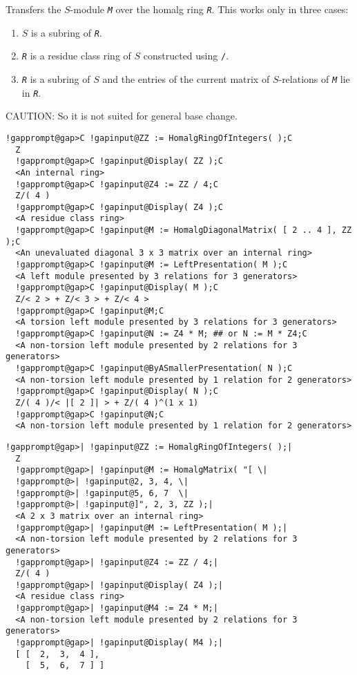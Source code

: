 \documentclass[a4paper,11pt]{report}
\begin{document}
{{{ Transfers the $S$-module \mbox{\texttt{\mdseries\slshape M}} over the \textsf{homalg} ring \mbox{\texttt{\mdseries\slshape R}}. This works only in three cases: 
\begin{enumerate}
\item $S$ is a subring of \mbox{\texttt{\mdseries\slshape R}}.
\item \mbox{\texttt{\mdseries\slshape R}} is a residue class ring of $S$ constructed using \texttt{/}.
\item \mbox{\texttt{\mdseries\slshape R}} is a subring of $S$ and the entries of the current matrix of $S$-relations of \mbox{\texttt{\mdseries\slshape M}} lie in \mbox{\texttt{\mdseries\slshape R}}.
\end{enumerate}
 CAUTION: So it is not suited for general base change. 
\begin{Verbatim}[commandchars=!@C,fontsize=\small,frame=single,label=Example]
  !gapprompt@gap>C !gapinput@ZZ := HomalgRingOfIntegers( );C
  Z
  !gapprompt@gap>C !gapinput@Display( ZZ );C
  <An internal ring>
  !gapprompt@gap>C !gapinput@Z4 := ZZ / 4;C
  Z/( 4 )
  !gapprompt@gap>C !gapinput@Display( Z4 );C
  <A residue class ring>
  !gapprompt@gap>C !gapinput@M := HomalgDiagonalMatrix( [ 2 .. 4 ], ZZ );C
  <An unevaluated diagonal 3 x 3 matrix over an internal ring>
  !gapprompt@gap>C !gapinput@M := LeftPresentation( M );C
  <A left module presented by 3 relations for 3 generators>
  !gapprompt@gap>C !gapinput@Display( M );C
  Z/< 2 > + Z/< 3 > + Z/< 4 >
  !gapprompt@gap>C !gapinput@M;C
  <A torsion left module presented by 3 relations for 3 generators>
  !gapprompt@gap>C !gapinput@N := Z4 * M; ## or N := M * Z4;C
  <A non-torsion left module presented by 2 relations for 3 generators>
  !gapprompt@gap>C !gapinput@ByASmallerPresentation( N );C
  <A non-torsion left module presented by 1 relation for 2 generators>
  !gapprompt@gap>C !gapinput@Display( N );C
  Z/( 4 )/< |[ 2 ]| > + Z/( 4 )^(1 x 1)
  !gapprompt@gap>C !gapinput@N;C
  <A non-torsion left module presented by 1 relation for 2 generators>
\end{Verbatim}
 
\begin{Verbatim}[commandchars=!@|,fontsize=\small,frame=single,label=Example]
  !gapprompt@gap>| !gapinput@ZZ := HomalgRingOfIntegers( );|
  Z
  !gapprompt@gap>| !gapinput@M := HomalgMatrix( "[ \|
  !gapprompt@>| !gapinput@2, 3, 4, \|
  !gapprompt@>| !gapinput@5, 6, 7  \|
  !gapprompt@>| !gapinput@]", 2, 3, ZZ );|
  <A 2 x 3 matrix over an internal ring>
  !gapprompt@gap>| !gapinput@M := LeftPresentation( M );|
  <A non-torsion left module presented by 2 relations for 3 generators>
  !gapprompt@gap>| !gapinput@Z4 := ZZ / 4;|
  Z/( 4 )
  !gapprompt@gap>| !gapinput@Display( Z4 );|
  <A residue class ring>
  !gapprompt@gap>| !gapinput@M4 := Z4 * M;|
  <A non-torsion left module presented by 2 relations for 3 generators>
  !gapprompt@gap>| !gapinput@Display( M4 );|
  [ [  2,  3,  4 ],
    [  5,  6,  7 ] ]
  

\end{Verbatim}}}}
\end{document}
